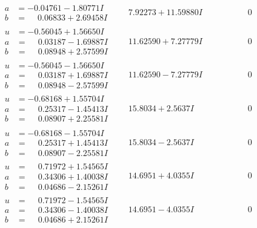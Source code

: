 \documentclass[1p]{elsarticle_modified}
\theoremstyle{definition}
\begin{document}
$$\begin{array}{c|c|c}
\begin{aligned}
a &= -0.04761 - 1.80771 I \\
b &= \phantom{-}0.06833 + 2.69458 I\end{aligned}
 & \phantom{-}7.92273 + 11.59880 I & \phantom{-0.000000 } 0 \\ \hline\begin{aligned}
u &= -0.56045 + 1.56650 I \\
a &= \phantom{-}0.03187 - 1.69887 I \\
b &= \phantom{-}0.08948 + 2.57599 I\end{aligned}
 & \phantom{-}11.62590 + 7.27779 I & \phantom{-0.000000 } 0 \\ \hline\begin{aligned}
u &= -0.56045 - 1.56650 I \\
a &= \phantom{-}0.03187 + 1.69887 I \\
b &= \phantom{-}0.08948 - 2.57599 I\end{aligned}
 & \phantom{-}11.62590 - 7.27779 I & \phantom{-0.000000 } 0 \\ \hline\begin{aligned}
u &= -0.68168 + 1.55704 I \\
a &= \phantom{-}0.25317 - 1.45413 I \\
b &= \phantom{-}0.08907 + 2.25581 I\end{aligned}
 & \phantom{-}15.8034 + 2.5637 I & \phantom{-0.000000 } 0 \\ \hline\begin{aligned}
u &= -0.68168 - 1.55704 I \\
a &= \phantom{-}0.25317 + 1.45413 I \\
b &= \phantom{-}0.08907 - 2.25581 I\end{aligned}
 & \phantom{-}15.8034 - 2.5637 I & \phantom{-0.000000 } 0 \\ \hline\begin{aligned}
u &= \phantom{-}0.71972 + 1.54565 I \\
a &= \phantom{-}0.34306 + 1.40038 I \\
b &= \phantom{-}0.04686 - 2.15261 I\end{aligned}
 & \phantom{-}14.6951 + 4.0355 I & \phantom{-0.000000 } 0 \\ \hline\begin{aligned}
u &= \phantom{-}0.71972 - 1.54565 I \\
a &= \phantom{-}0.34306 - 1.40038 I \\
b &= \phantom{-}0.04686 + 2.15261 I\end{aligned}
 & \phantom{-}14.6951 - 4.0355 I & \phantom{-0.000000 } 0 \\ \hline\begin{aligned}

\end{aligned}
\end{array}$$
\end{document}
